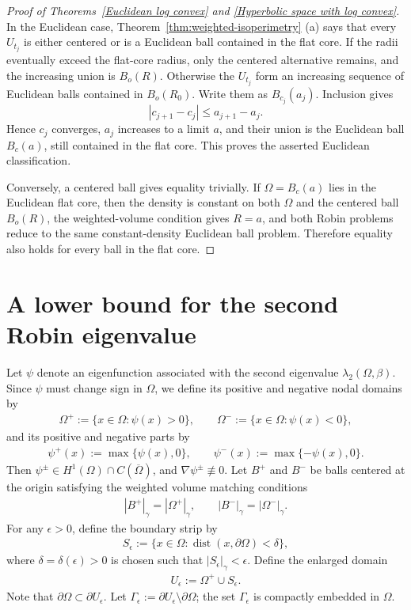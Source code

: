 \documentclass[11pt,leqno]{amsart}
\def\l{\lambda}
\numberwithin{equation}{section}
\begin{document}
\begin{proof}[Proof of Theorems~\ref{Euclidean log convex} and \ref{Hyperbolic space with log convex}]
In the Euclidean case, Theorem~\ref{thm:weighted-isoperimetry}
\textup{(a)} says that every
\(U_{t_j}\) is either centered or is a Euclidean ball contained in
the flat core.  If the radii eventually exceed the flat-core radius,
only the centered alternative remains, and the increasing union is
\(B_o(R)\).  Otherwise the \(U_{t_j}\) form an increasing sequence
of Euclidean balls contained in \(B_o(R_0)\).  Write them as
\(B_{c_j}(a_j)\).  Inclusion gives
\[
|c_{j+1}-c_j|\leq a_{j+1}-a_j.
\]
Hence \(c_j\) converges, \(a_j\) increases to a limit \(a\), and
their union is the Euclidean ball \(B_c(a)\), still contained in the
flat core.  This proves the asserted Euclidean classification.

Conversely, a centered ball gives equality trivially.  If
\(\Omega=B_c(a)\) lies in the Euclidean flat core, then the density is
constant on both \(\Omega\) and the centered ball \(B_o(R)\), the
weighted-volume condition gives \(R=a\), and both Robin problems
reduce to the same constant-density Euclidean ball problem.
Therefore equality also holds for every ball in the flat core.
\end{proof}

\section{A lower bound for the second Robin eigenvalue}\label{sect6}
Let $\psi$ denote an eigenfunction associated with the second eigenvalue $\l_2(\Omega, \beta)$. Since $\psi$ must change sign in $\Omega$, we define its positive and negative nodal domains by
\begin{align*}
\Omega^{+}:=\{x\in \Omega: \psi(x)>0\},\qquad \Omega^{-}:=\{x\in \Omega: \psi(x)<0\},
\end{align*}
and its positive and negative parts  by
\begin{align*}
\psi^{+}(x):=\max\{\psi(x),0\},\qquad \psi^{-}(x):=\max\{-\psi(x),0\}.
\end{align*}
Then $\psi^{\pm}\in H^{1}(\Omega)\cap C(\overline{\Omega})$, and $\nabla\psi^{\pm}\not\equiv 0$. Let $B^{+}$ and $B^{-}$ be balls centered at the origin satisfying the weighted volume matching conditions 
\begin{align*}
    |B^{+}|_{\gamma}=|\Omega^{+}|_{\gamma}, \qquad |B^{-}|_{\gamma}=|\Omega^{-}|_{\gamma}.
\end{align*}
For any $\epsilon>0$, define the boundary strip by
\begin{align*}
S_{\epsilon}:=\{x\in \Omega: \operatorname{dist}(x,\partial \Omega)<\delta\},
\end{align*}
where $\delta=\delta(\epsilon)>0$ is chosen such that $|S_{\epsilon}|_{\gamma}<\epsilon$. Define the enlarged domain
\begin{align*}
U_{\epsilon}:=\Omega^{+}\cup S_{\epsilon}.
\end{align*}
Note that $\partial \Omega\subset \partial U_{\epsilon}$. Let $\Gamma_{\epsilon}:=\partial U_{\epsilon}\setminus\partial \Omega$; the set $\Gamma_{\epsilon}$ is compactly embedded in $\Omega$. 
\end{document}
